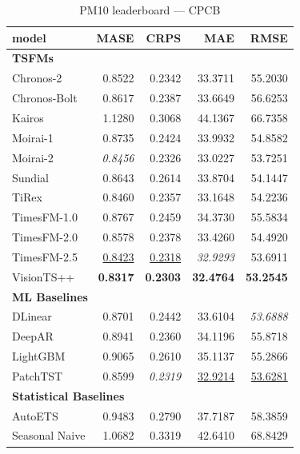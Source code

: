 \begin{table}[H]
\caption{PM10 leaderboard --- CPCB}
\centering
\begin{small}
\begin{tabular}{lrrrr}
\toprule
model & MASE & CRPS & MAE & RMSE \\
\midrule
\multicolumn{5}{l}{\textbf{TSFMs}} \\
Chronos-2 & 0.8522 & 0.2342 & 33.3711 & 55.2030 \\
Chronos-Bolt & 0.8617 & 0.2387 & 33.6649 & 56.6253 \\
Kairos & 1.1280 & 0.3068 & 44.1367 & 66.7358 \\
Moirai-1 & 0.8735 & 0.2424 & 33.9932 & 54.8582 \\
Moirai-2 & \textit{0.8456} & 0.2326 & 33.0227 & 53.7251 \\
Sundial & 0.8643 & 0.2614 & 33.8704 & 54.1447 \\
TiRex & 0.8460 & 0.2357 & 33.1648 & 54.2236 \\
TimesFM-1.0 & 0.8767 & 0.2459 & 34.3730 & 55.5834 \\
TimesFM-2.0 & 0.8578 & 0.2378 & 33.4260 & 54.4920 \\
TimesFM-2.5 & \underline{0.8423} & \underline{0.2318} & \textit{32.9293} & 53.6911 \\
VisionTS++ & \textbf{0.8317} & \textbf{0.2303} & \textbf{32.4764} & \textbf{53.2545} \\
\midrule
\multicolumn{5}{l}{\textbf{ML Baselines}} \\
DLinear & 0.8701 & 0.2442 & 33.6104 & \textit{53.6888} \\
DeepAR & 0.8941 & 0.2360 & 34.1196 & 55.8718 \\
LightGBM & 0.9065 & 0.2610 & 35.1137 & 55.2866 \\
PatchTST & 0.8599 & \textit{0.2319} & \underline{32.9214} & \underline{53.6281} \\
\midrule
\multicolumn{5}{l}{\textbf{Statistical Baselines}} \\
AutoETS & 0.9483 & 0.2790 & 37.7187 & 58.3859 \\
Seasonal Naive & 1.0682 & 0.3319 & 42.6410 & 68.8429 \\
\bottomrule
\end{tabular}
\end{small}
\end{table}
